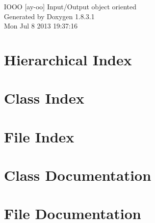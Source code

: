 \documentclass{book}
\begin{document}
\hypersetup{pageanchor=false,citecolor=blue}
\begin{titlepage}
\vspace*{7cm}
\begin{center}
{\Large I\-O\-O\-O \mbox{[}ay-\/oo\mbox{]} Input/\-Output object oriented }\\
\vspace*{1cm}
{\large Generated by Doxygen 1.8.3.1}\\
\vspace*{0.5cm}
{\small Mon Jul 8 2013 19:37:16}\\
\end{center}
\end{titlepage}
\clearemptydoublepage
{}
\tableofcontents
\clearemptydoublepage
{}
\hypersetup{pageanchor=true,citecolor=blue}
\chapter{Hierarchical Index}

\chapter{Class Index}

\chapter{File Index}

\chapter{Class Documentation}















\chapter{File Documentation}
























\printindex
\end{document}
